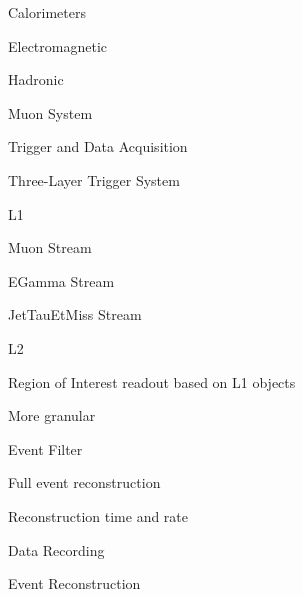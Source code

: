 \documentclass[11pt]{report}
\begin{document}
\begin{outline}
	\item Calorimeters
	\begin{outline}
		\item Electromagnetic
		\item Hadronic
	\end{outline}
	
	\item Muon System

	
	\item Trigger and Data Acquisition
	\begin{outline}
		\item Three-Layer Trigger System
		\begin{outline}
			\item L1
			\begin{outline}
				\item Muon Stream
				\item EGamma Stream
				\item JetTauEtMiss Stream
			\end{outline}
			\item L2
			\begin{outline}
				\item Region of Interest readout based on L1 objects
				\item More granular
			\end{outline}
			\item Event Filter
			\begin{outline}
				\item Full event reconstruction
				\item Reconstruction time and rate
			\end{outline}
		\end{outline}
		\item Data Recording
		\item Event Reconstruction
	\end{outline}
	
	


\end{outline}  
\end{document}

